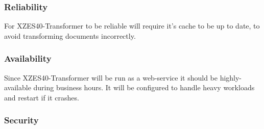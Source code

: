 \subsubsection{Reliability}

For XZES40-Transformer to be reliable will require it's cache to be up to date, to avoid transforming documents incorrectly.


\subsubsection{Availability}

Since XZES40-Transformer will be run as a web-service it should be highly-available during business hours.
It will be configured to handle heavy workloads and restart if it crashes.


\subsubsection{Security}

